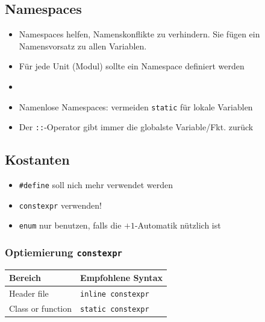 \subsection{Namespaces}
\begin{itemize}
    \item Namespaces helfen, Namenskonflikte zu verhindern. 
        Sie fügen ein Namensvorsatz zu allen Variablen. 
    \item Für jede Unit (Modul) sollte ein Namespace definiert werden
    \item {}
    \item Namenlose Namespaces: vermeiden \texttt{static} für lokale Variablen
    \item Der \texttt{::}-Operator gibt immer die globalste Variable/Fkt. zurück
\end{itemize}



\subsection{Kostanten}

\begin{itemize}
    \item \texttt{\#define} soll nich mehr verwendet werden
    \item \texttt{constexpr} verwenden!
    \item \texttt{enum} nur benutzen, falls die $+1$-Automatik nützlich ist
\end{itemize}


\subsubsection{Optiemierung \texttt{constexpr}}

\begin{center}
    \begin{tabular}{ll}
    \toprule
    \textbf{Bereich} & \textbf{Empfohlene Syntax} \\
    \midrule
    Header file & \texttt{inline constexpr} \\
    Class or function & \texttt{static constexpr} \\
    \bottomrule
\end{tabular}
\end{center}